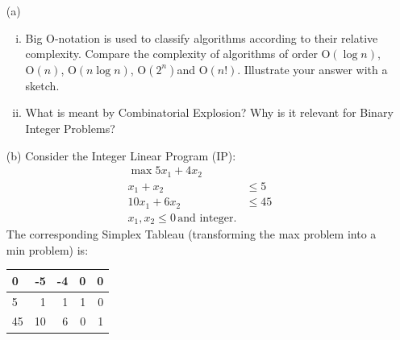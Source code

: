 \documentclass[12pt]{article}
\begin{document}
		\begin{itemize}
			
			
			
		
		\item[(a)]
		\begin{enumerate}[(i)]
			\item Big O-notation is used to classify algorithms according to their relative complexity. Compare the complexity of algorithms of order $\mathrm{O}(\log n)$, $\mathrm{O}(n)$, $\mathrm{O}(n\log n)$, $\mathrm{O}(2^n)$and $\mathrm{O}(n!)$. Illustrate your answer with a sketch. 
			
			\item What is meant by Combinatorial Explosion? Why is it relevant for Binary Integer Problems? 
			
		\end{enumerate}	
			
			\item[(b)]  Consider the Integer Linear Program (IP):
			\begin{eqnarray*}
				\max 5 x_1 +4 x_2\\
				x_1+x_2&\le 5\\
				10x_1+6x_2 &\le 45\\
				x_1, x_2 \le 0 \, \text{and integer.}
			\end{eqnarray*}
			The corresponding Simplex Tableau (transforming the max problem into a min problem)  is:
			\begin{center}
				\begin{tabular}[h]{|l|rrrr|}\hline
					0&-5&-4&0&0\\\hline
					5&1&1&1&0\\
					45&10&6&0&1\\\hline
				\end{tabular}
			\end{center}
%			
			

\end{itemize}
\end{document}
